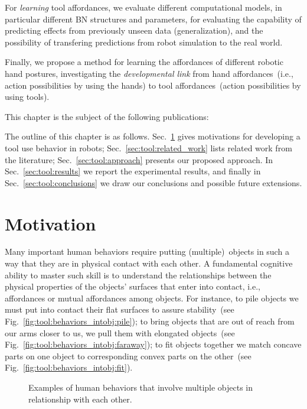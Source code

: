 For \emph{learning} tool affordances, we evaluate different computational models, in particular different \ac{BN} structures and parameters, for evaluating
the capability of predicting effects from previously unseen data (generalization), and the possibility of transfering predictions from robot simulation to the real world.

Finally, we propose a method for learning the affordances of different robotic hand postures, investigating the \emph{developmental link} from hand affordances~(i.e., action possibilities by using the hands) to tool affordances~(action possibilities by using tools).

This chapter is the subject of the following publications:
\listPublicationsTools

The outline of this chapter is as follows.
Sec.~\ref{sec:tool:motivation} gives motivations for developing a tool use behavior in robots;
Sec.~\ref{sec:tool:related_work} lists related work from the literature;
Sec.~\ref{sec:tool:approach} presents our proposed approach.
In Sec.~\ref{sec:tool:results} we report the experimental results,
and finally in Sec.~\ref{sec:tool:conclusions} we draw our conclusions and possible future extensions.

\section{Motivation}
\label{sec:tool:motivation}

Many important human behaviors require putting (multiple)~objects in such a way that they are in physical contact with each other.
A fundamental cognitive ability to master such skill is to understand the relationships between the physical properties of the objects' surfaces that enter into contact, i.e., \emph{\intobj} affordances or mutual affordances among objects.
For instance, to pile objects we must put into contact their flat surfaces to assure stability~(see Fig.~\ref{fig:tool:behaviors_intobj:pile});
to bring objects that are out of reach from our arms closer to us, we pull them with elongated objects~(see Fig.~\ref{fig:tool:behaviors_intobj:faraway});
to fit objects together we match concave parts on one object to corresponding convex parts on the other~(see Fig.~\ref{fig:tool:behaviors_intobj:fit}).

\begin{figure}
\centering
{} \quad
%
 \quad
%
\caption{Examples of human behaviors that involve multiple objects in relationship with each other.}
\label{fig:tool:behaviors_intobj}
\end{figure}

